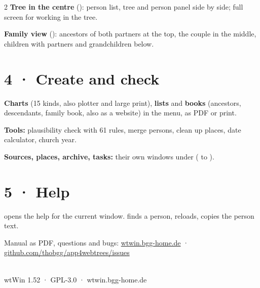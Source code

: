 \documentclass[a4paper, 9.5pt, parskip=half]{scrartcl}
\begin{document}
\begin{multicols}{2}
\textbf{Tree in the centre} (): person list, tree and person panel side by side; full screen for working in the tree.

\textbf{Family view} (): ancestors of both partners at the top, the couple in the middle, children with partners and grandchildren below.
\section*{4 · Create and check}
\textbf{Charts} (15 kinds, also plotter and large print), \textbf{lists} and \textbf{books} (ancestors, descendants, family book, also as a website) in the  menu, as PDF or print.

\textbf{Tools:} plausibility check with 61 rules, merge persons, clean up places, date calculator, church year.

\textbf{Sources, places, archive, tasks:} their own windows under  ( to ).
\section*{5 · Help}
 opens the help for the current window.  finds a person,  reloads,  copies the person text.

Manual as PDF, questions and bugs: \href{https://wtwin.bgg-home.de}{wtwin.bgg-home.de} · \href{https://github.com/thobgg/app4webtrees/issues}{github.com/thobgg/app4webtrees/issues}
\vspace{3mm}
\noindent{}
\end{multicols}
\vspace{2mm}
\noindent{\color{wtLinie}\rule{\linewidth}{0.5pt}}\\[2pt]
{\sffamily\footnotesize\color{wtGrau}wtWin 1.52 · GPL-3.0 · wtwin.bgg-home.de}
\end{document}
